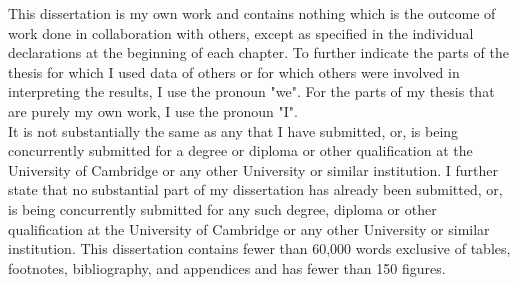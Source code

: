 
\begin{declaration}

This dissertation is my own work and contains nothing which is the outcome of work done in collaboration with others, except as specified in the individual declarations at the beginning of each chapter. To further indicate the parts of the thesis for which I used data of others or for which others were involved in interpreting the results, I use the pronoun "we". For the parts of my thesis that are purely my own work, I use the pronoun "I".  \\

It is not substantially the same as any that I have submitted, or, is being concurrently submitted for a degree or diploma or other qualification at the University of Cambridge or any other University or similar institution. I further state that no substantial part of my dissertation has already been submitted, or, is being concurrently submitted for any such degree, diploma or other qualification at the University of Cambridge or any other University or similar institution. This dissertation contains fewer than 60,000 words exclusive of tables, footnotes, bibliography, and appendices and has fewer than 150 figures.
\end{declaration}

